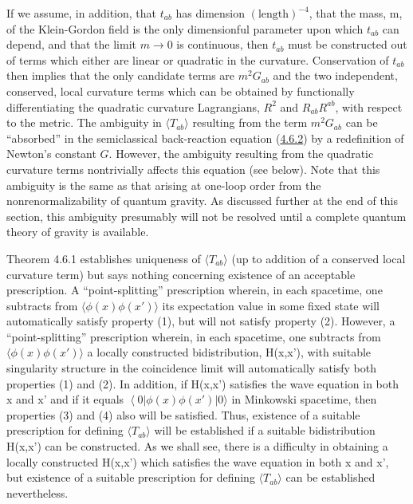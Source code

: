 \documentclass[11pt,a4paper]{article}
\providecommand{\bra}[1]{\left\langle#1\right\rvert}
\begin{document}
If we assume, in addition, that \(t_{ab}\) has dimension \((\text{length})^{-4}\), that the mass, m, of the Klein-Gordon field is the only dimensionful parameter upon which \(t_{ab}\) can depend, and that the limit \(m\rightarrow 0\) is continuous, then \(t_{ab}\) must be constructed out of terms which either are linear or quadratic in the curvature. Conservation of \(t_{ab}\) then implies that the only candidate terms are \(m^2G_{ab}\) and the two independent, conserved, local curvature terms which can be obtained by functionally differentiating the quadratic curvature Lagrangians, \(R^2\) and \(R_{ab}R^{ab}\), with respect to the metric. The ambiguity in \(\langle T_{ab}\rangle\) resulting from the term \(m^2G_{ab}\) can be ``absorbed'' in the semiclassical back-reaction equation (\hyperref[eq:4.6.2]{4.6.2}) by a redefinition of Newton's constant \(G\). However, the ambiguity resulting from the quadratic curvature terms nontrivially affects this equation (see below). Note that this ambiguity is the same as that arising at one-loop order from the nonrenormalizability of quantum gravity. As discussed further at the end of this section, this ambiguity presumably will not be resolved until a complete quantum theory of gravity is available.

\hypertarget{source-104}{}

Theorem 4.6.1 establishes uniqueness of \(\langle T_{ab}\rangle\) (up to addition of a conserved local curvature term) but says nothing concerning existence of an acceptable prescription. A ``point-splitting'' prescription wherein, in each spacetime, one subtracts from \(\langle \phi(x) \phi(x') \rangle\) its expectation value in some fixed state will automatically satisfy property (1), but will not satisfy property (2). However, a ``point-splitting'' prescription wherein, in each spacetime, one subtracts from \(\langle \phi(x)\phi(x') \rangle\) a locally constructed bidistribution, H(x,x'), with suitable singularity structure in the coincidence limit will automatically satisfy both properties (1) and (2). In addition, if H(x,x') satisfies the wave equation in both x and x' and if it equals \(\bra0 \phi(x)\phi(x')\lvert 0\rangle \) in Minkowski spacetime, then properties (3) and (4) also will be satisfied. Thus, existence of a suitable prescription for defining \(\langle T_{ab} \rangle\) will be established if a suitable bidistribution H(x,x') can be constructed. As we shall see, there is a difficulty in obtaining a locally constructed H(x,x') which satisfies the wave equation in both x and x', but existence of a suitable prescription for defining \(\langle T_{ab} \rangle\) can be established nevertheless.
\end{document}
